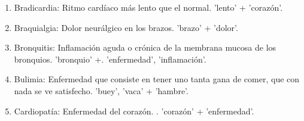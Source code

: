 \documentclass{mylib/reporte}
\begin{document}
\begin{enumerate}
	\item Bradicardia: Ritmo cardíaco más lento que el normal. 'lento' + 'corazón'.
	\item Braquialgia: Dolor neurálgico en los brazos. 'brazo' +  'dolor'.
	\item Bronquitis: Inflamación aguda o crónica de la membrana mucosa de los bronquios.   'bronquio' +. 'enfermedad', 'inflamación'.
	\item Bulimia: Enfermedad que consiste en tener uno tanta gana de comer, que con nada se ve satisfecho.  'buey', 'vaca' + 'hambre'.
	\item Cardiopatía: Enfermedad del corazón. . 'corazón' + 'enfermedad'.

\end{enumerate}
\end{document}
